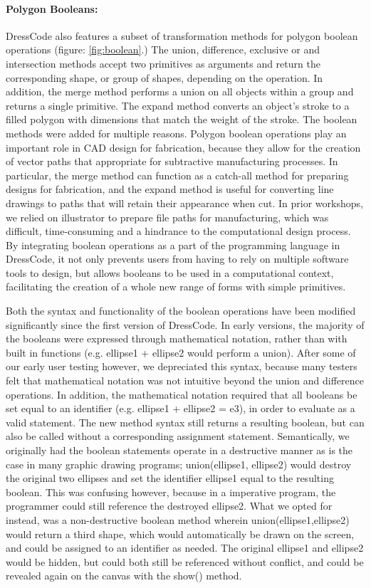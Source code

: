 \paragraph{Polygon Booleans:}
DressCode also features a subset of transformation methods for polygon boolean operations (figure: \ref{fig:boolean}.) The union, difference, exclusive or and intersection methods accept two primitives as arguments and return the corresponding shape, or group of shapes, depending on the operation. In addition, the merge method performs a union on all objects within a group and returns a single primitive. The expand method converts an object's stroke to a filled polygon with dimensions that match the weight of the stroke. The boolean methods were added for multiple reasons. Polygon boolean operations play an important role in CAD design for fabrication, because they allow for the creation of vector paths that appropriate for subtractive manufacturing processes. In particular, the merge method can function as a catch-all method for preparing designs for fabrication, and the expand method is useful for converting line drawings to paths that will retain their appearance when cut. In prior workshops, we relied on illustrator to prepare file paths for manufacturing, which was difficult, time-consuming and a hindrance to the computational design process. By integrating boolean operations as a part of the programming language in DressCode, it not only prevents users from having to rely on multiple software tools to design, but allows booleans to be used in a computational context, facilitating the creation of a whole new range of forms with simple primitives. 

Both the syntax and functionality of the boolean operations have been modified significantly since the first version of DressCode. In early versions, the majority of the booleans were expressed through mathematical notation, rather than with built in functions (e.g. ellipse1 + ellipse2 would perform a union). After some of our early user testing however, we depreciated this syntax, because many testers felt that mathematical notation was not intuitive beyond the union and difference operations. In addition, the mathematical notation required that all booleans be set equal to an identifier  (e.g. ellipse1 + ellipse2 = e3), in order to evaluate as a valid statement. The new method syntax still returns a resulting boolean, but can also be called without a corresponding assignment statement. Semantically, we originally had the boolean statements operate in a destructive manner as is the case in many graphic drawing programs; union(ellipse1, ellipse2) would destroy the original two ellipses and set the identifier ellipse1 equal to the resulting boolean. This was confusing however, because in a imperative program, the programmer could still reference the destroyed ellipse2. What we opted for instead, was a non-destructive boolean method wherein union(ellipse1,ellipse2) would return a third shape, which would automatically be drawn on the screen, and could be assigned to an identifier as needed. The original ellipse1 and ellipse2 would be hidden, but could both still be referenced without conflict, and could be revealed again on the canvas with the show() method. 

